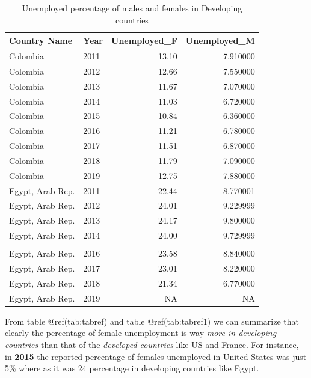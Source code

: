 \documentclass[
]{article}
\begin{document}
\begin{table}[H]

\caption{\label{tab:tabref1}Unemployed percentage of males and females in Developing countries}
\centering
\begin{tabular}[t]{l|l|r|r}
\hline
Country Name & Year & Unemployed\_F & Unemployed\_M\\
\hline
Colombia & 2011 & 13.10 & 7.910000\\
\hline
Colombia & 2012 & 12.66 & 7.550000\\
\hline
Colombia & 2013 & 11.67 & 7.070000\\
\hline
Colombia & 2014 & 11.03 & 6.720000\\
\hline
Colombia & 2015 & 10.84 & 6.360000\\
\hline
Colombia & 2016 & 11.21 & 6.780000\\
\hline
Colombia & 2017 & 11.51 & 6.870000\\
\hline
Colombia & 2018 & 11.79 & 7.090000\\
\hline
Colombia & 2019 & 12.75 & 7.880000\\
\hline
Egypt, Arab Rep. & 2011 & 22.44 & 8.770001\\
\hline
Egypt, Arab Rep. & 2012 & 24.01 & 9.229999\\
\hline
Egypt, Arab Rep. & 2013 & 24.17 & 9.800000\\
\hline
Egypt, Arab Rep. & 2014 & 24.00 & 9.729999\\
\hline
\cellcolor{red}{\textcolor{white}{\textbf{Egypt, Arab Rep.}}} & \cellcolor{red}{\textcolor{white}{\textbf{2015}}} & \cellcolor{red}{\textcolor{white}{\textbf{24.81}}} & \cellcolor{red}{\textcolor{white}{\textbf{9.390000}}}\\
\hline
Egypt, Arab Rep. & 2016 & 23.58 & 8.840000\\
\hline
Egypt, Arab Rep. & 2017 & 23.01 & 8.220000\\
\hline
Egypt, Arab Rep. & 2018 & 21.34 & 6.770000\\
\hline
Egypt, Arab Rep. & 2019 & NA & NA\\
\hline
\end{tabular}
\end{table}

From table @ref(tab:tabref) and table @ref(tab:tabref1) we can summarize
that clearly the percentage of female unemployment is way \emph{more in
developing countries} than that of the \emph{developed countries} like
US and France. For instance, in \textbf{2015} the reported percentage of
females unemployed in United States was just 5\% where as it was 24
percentage in developing countries like Egypt.
\end{document}
